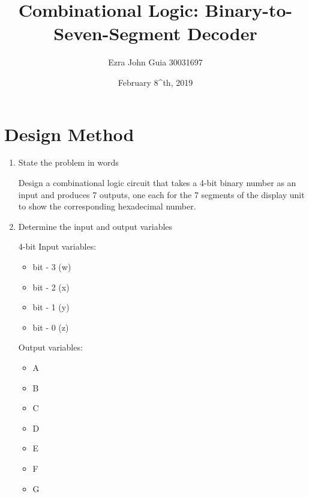\documentclass{article}
\title{Combinational Logic: Binary-to-Seven-Segment Decoder}
\author{Ezra John Guia
        30031697}
\date{February 8^{th}, 2019}
\begin{document}
\maketitle

\section*{Design Method}

\begin{enumerate}[label=\arabic*]

    \item State the problem in words
    \vspace{1 mm}
    
    Design a combinational logic circuit that takes a 4-bit binary number as an input and produces 7 outputs, one each for the 7 segments of the display unit to show the corresponding hexadecimal number.
    
    \vspace{3 mm}
    \item Determine the input and output variables
    \vspace{1 mm}
    
    \begin{varwidth}[t]{.5\textwidth}
        4-bit Input variables:
        \begin{itemize}
            \item bit - 3 (w)
            \item bit - 2 (x)
            \item bit - 1 (y)
            \item bit - 0 (z)
        \end{itemize}
    \end{varwidth}
        \hspace{4em}
    \begin{varwidth}[t]{.5\textwidth}
        Output variables:
        \begin{itemize}
            \item A
            \item B
            \item C
            \item D
            \item E
            \item F
            \item G
        \end{itemize}
    \end{varwidth}
    

\end{enumerate}
\end{document}
